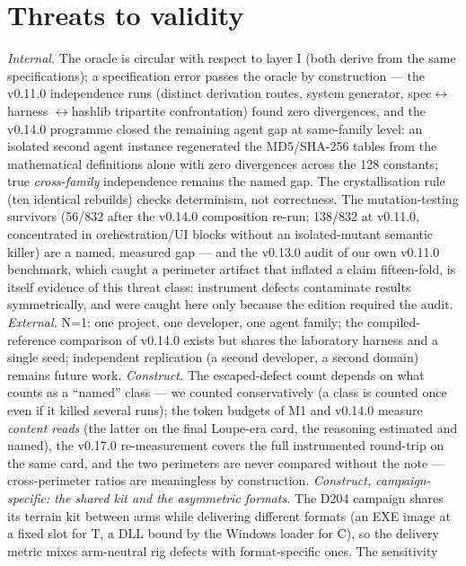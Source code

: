\documentclass[11pt,a4paper]{article}
\begin{document}
\section{Threats to validity}\label{sec:threats}

\emph{Internal.} The oracle is circular with respect to layer I
(both derive from the same specifications); a specification error passes
the oracle by construction --- the v0.11.0 independence runs (distinct
derivation routes, system generator, spec$\leftrightarrow$\allowbreak harness
$\leftrightarrow$\allowbreak hashlib tripartite confrontation) found zero
divergences, and the v0.14.0 programme closed the remaining agent gap
at same-family level: an isolated second agent instance regenerated the
MD5/SHA-256 tables from the mathematical definitions alone with zero
divergences across the 128 constants; true \emph{cross-family}
independence remains the named gap. The crystallisation rule (ten
identical rebuilds) checks
determinism, not correctness. The mutation-testing survivors (56/832
after the v0.14.0 composition re-run; 138/832 at v0.11.0,
concentrated in orchestration/UI blocks without an isolated-mutant
semantic killer) are a named, measured gap --- and the v0.13.0 audit of
our own v0.11.0 benchmark, which caught a perimeter artifact that
inflated a claim fifteen-fold, is itself evidence of this threat class:
instrument defects contaminate results symmetrically, and were caught
here only because the edition required the audit. \emph{External.} N=1: one
project, one developer, one agent family; the compiled-reference
comparison of v0.14.0 exists but shares the laboratory harness and a
single seed; independent replication (a second developer, a second
domain) remains future work. \emph{Construct.} The
escaped-defect count depends on what counts as a ``named'' class --- we
counted conservatively (a class is counted once even if it killed several
runs); the token budgets of M1 and v0.14.0 measure \emph{content reads}
(the latter on the final Loupe-era card, the reasoning estimated and
named), the v0.17.0 re-measurement covers the full instrumented
round-trip on the same card, and the two perimeters are never compared
without the note --- cross-perimeter ratios are meaningless by
construction.
\emph{Construct, campaign-specific: the shared kit and the asymmetric
formats.} The D204 campaign shares its terrain kit between arms while
delivering different formats (an EXE image at a fixed slot for T, a DLL
bound by the Windows loader for C), so the delivery metric mixes
arm-neutral rig defects with format-specific ones. The sensitivity
\end{document}
